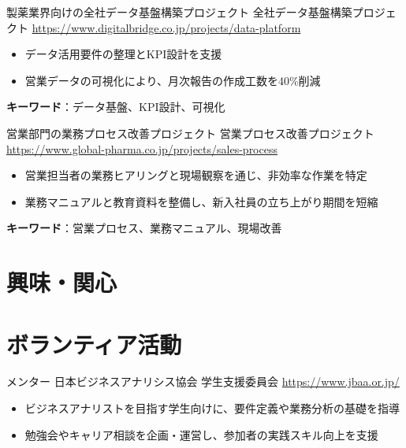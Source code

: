 \documentclass[a4paper, serif, 10pt]{moderncv}
\begin{document}
        {製薬業界向けの全社データ基盤構築プロジェクト}
        {全社データ基盤構築プロジェクト}
        {\url{https://www.digitalbridge.co.jp/projects/data-platform}}
        {}
        {\begin{itemize}
\item データ活用要件の整理とKPI設計を支援
\item 営業データの可視化により、月次報告の作成工数を40\%削減
\end{itemize}
\textbf{キーワード}：データ基盤、KPI設計、可視化}

        {営業部門の業務プロセス改善プロジェクト}
        {営業プロセス改善プロジェクト}
        {\url{https://www.global-pharma.co.jp/projects/sales-process}}
        {}
        {\begin{itemize}
\item 営業担当者の業務ヒアリングと現場観察を通じ、非効率な作業を特定
\item 業務マニュアルと教育資料を整備し、新入社員の立ち上がり期間を短縮
\end{itemize}
\textbf{キーワード}：営業プロセス、業務マニュアル、現場改善}
\section{興味・関心}

\section{ボランティア活動}

        {メンター}
        {日本ビジネスアナリシス協会 学生支援委員会}
        {\url{https://www.jbaa.or.jp/}}
        {}
        {\begin{itemize}
\item ビジネスアナリストを目指す学生向けに、要件定義や業務分析の基礎を指導
\item 勉強会やキャリア相談を企画・運営し、参加者の実践スキル向上を支援
\end{itemize}}
    
\end{document}
